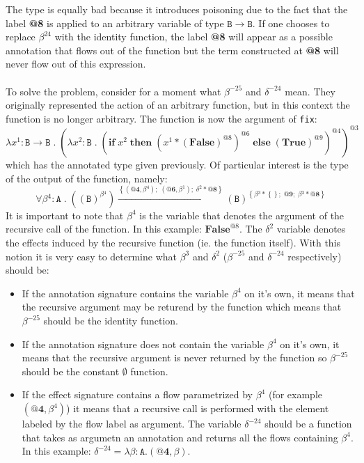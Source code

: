 \documentclass[8pt]{extarticle}
\begin{document}
The type is equally bad because it introduces poisoning due to the fact that the label {\bf @8} is applied to an arbitrary variable of type $\mathtt{B}\to\mathtt{B}$. If one chooses to replace $\beta^{24}$ with the identity function, the label {\bf @8} will appear as a possible annotation that flows out of the function but the term constructed at {\bf @8} will never flow out of this expression.
\\\\
To solve the problem, consider for a moment what $\beta^{-25}$ and $\delta^{-24}$ mean. They originally represented the action of an arbitrary function, but in this context the function is no longer arbitrary. The function is now the argument of \verb+fix+:
\[
\lambda{}x^{1}:\mathtt{B}\to{}\mathtt{B}\;{}.\;{}\left(\lambda{}x^{2}:\mathtt{B}\;{}.\;{}\left(\mathbf{if}\;{}x^{2}\;{}\mathbf{then}\;{}\left(x^{1}*\left(\mathbf{False}\right)^{\mathit{@8}}\right)^{\mathit{@6}}\;{}\mathbf{else}\;{}\left(\mathbf{True}\right)^{\mathit{@9}}\right)^{\mathit{@4}}\right)^{\mathit{@3}}
\]
which has the annotated type given previously. Of particular interest is the type of the output of the function, namely:
\[
\forall{}\beta{}^{4}:\mathtt{A}\;{}.\;{}\left(\left(\mathtt{B}\right)^{\beta{}^{4}}\right)\xrightarrow{\left\{\left(\textbf{@4},\beta{}^{4}\right);\;{}\left(\textbf{@6},\beta{}^{1}\right);\;{}\delta{}^{2}*\textbf{@8}\right\}}\left(\mathtt{B}\right)^{\left\{\beta{}^{3}*\left\{\right\};\;{}\textbf{@9};\;{}\beta{}^{3}*\textbf{@8}\right\}}
\]
It is important to note that $\beta^{4}$ is the variable that denotes the argument of the recursive call of the function. In this example: $\mathbf{False}^{\mathit{@8}}$. The $\delta^2$ variable denotes the effects induced by the recursive function (ie. the function itself). With this notion it is very easy to determine what $\beta^{3}$ and $\delta^{2}$ ($\beta^{-25}$ and $\delta^{-24}$ respectively) should be:
\begin{itemize}
\item If the annotation signature contains the variable $\beta^{4}$ on it's own, it means that the recursive argument may be returend by the function which means that $\beta^{-25}$ should be the identity function.
\item If the annotation signature does not contain the variable $\beta^{4}$ on it's own, it means that the recursive argument is never returned by the function so $\beta^{-25}$ should be the constant $\emptyset$ function.
\item If the effect signature contains a flow parametrized by $\beta^{4}$ (for example $\left(\mathbf{@4},\beta^{4}\right)$) it means that a recursive call is performed with the element labeled by the flow label as argument. The variable $\delta^{-24}$ should be a function that takes as argumetn an annotation and returns all the flows containing $\beta^4$. In this example: $\delta^{-24}=\lambda\beta:\mathtt{A}.\left(\mathbf{@4},\beta\right)$.
\end{itemize}
\end{document}
